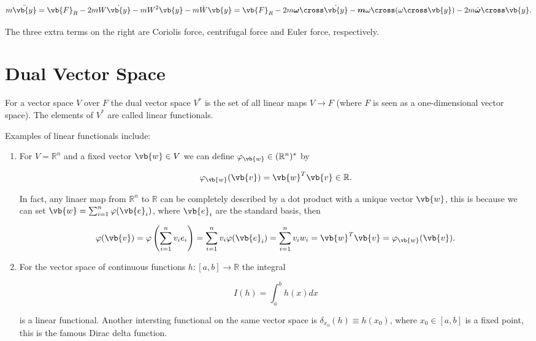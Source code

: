 \documentclass[a4paper,12pt]{report}
\begin{document}
\begin{equation}
    m \ddot{\vb{y} }  = \vb{F} _{R} - 2mW \dot{\vb{y} } - mW^2 \vb{y}  - m \dot{W} \vb{y} = \vb{F} _{R} - 2m \boldsymbol{\omega }\cross \dot{\vb{y} } - \boldsymbol{m} \omega \cross (\omega \cross \vb{y} ) - 2m \dot{\boldsymbol{\omega } }\cross \vb{y} .       
\end{equation}

The three extra terms on the right are Coriolis force, centrifugal force and Euler force, respectively.

\section{Dual Vector Space}

\begin{definition}
    For a vector space \(V\) over \(F\) the dual vector space \(V^*\) is the set of all linear maps \(V \to F\) (where \(F\) is seen as a one-dimensional vector space). The elements of \(V^*\) are called linear functionals.   
\end{definition}

Examples of linear functionals include:

\begin{enumerate}
    \item For \(V = \mathbb{R}^{n} \) and a fixed vector \(\vb{w} \in V\) we can define \(\varphi _{\vb{w} }\in (\mathbb{R}^{n} )^* \) by 
    
    \begin{equation}
        \varphi _{\vb{w} }(\vb{v} ) = \vb{w} ^T \vb{v} \in \mathbb{R}. 
    \end{equation}

    In fact, any linaer map from \(\mathbb{R}^{n} \) to \(\mathbb{R}\) can be completely described by a dot product with a unique vector \(\vb{w} \), this is because we can set \(\vb{w} = \sum_{i=1}^{n} \varphi (\vb{e} _{i} )\), where \(\vb{e} _{i} \) are the standard basis, then 
    
    \begin{equation}
        \varphi (\vb{v} ) = \varphi \left( \sum_{i=1}^{n} v_{i} e_{i}  \right) = \sum_{i=1}^{n} v_{i} \varphi (\vb{e} _{i} ) = \sum_{i=1}^{n} v_{i} w_{i} = \vb{w} ^T\vb{v} = \varphi _{\vb{w} }(\vb{v} ).  
    \end{equation}

    \item For the vector space of continuous functions \(h:[a,b] \to \mathbb{R}\) the integral 
    
    \begin{equation}
        I(h) = \int_{a}^{b} h(x)dx 
    \end{equation}

    is a linear functional. Another intersting functional on the same vector space is \(\delta _{x_0 }(h) \equiv h(x_0 ) \), where \(x_0 \in [a,b]\) is a fixed point, this is the famous Dirac delta function.  
\end{enumerate}
\end{document}

